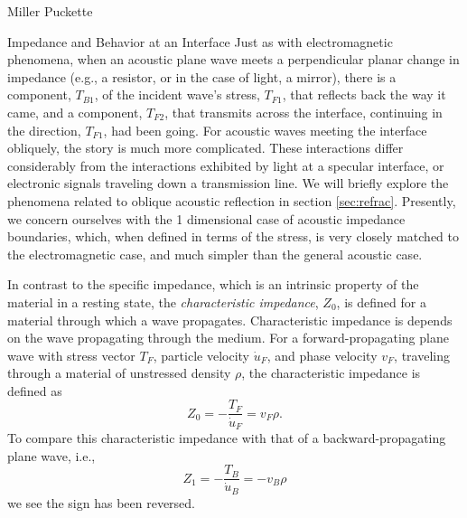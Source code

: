 \documentclass[a4paper,10pt]{report}
\numberwithin{equation}{section}
\begin{document}
\begin{chapter}{Miller Puckette}
\begin{section}{Impedance and Behavior at an Interface}
Just as with electromagnetic phenomena, when an acoustic plane wave meets a perpendicular planar change in impedance (e.g., a resistor, or in the case of light, a mirror), there is a component, $T_{B1}$, of the incident wave's stress, $T_{F1}$, that reflects back the way it came, and a component, $T_{F2}$, that transmits across the interface, continuing in the direction, $T_{F1}$, had been going. For acoustic waves meeting the interface obliquely, the story is much more complicated. These interactions differ considerably from the interactions exhibited by light at a specular interface, or electronic signals traveling down a transmission line. We will briefly explore the phenomena related to oblique acoustic reflection in section \ref{sec:refrac}. Presently, we concern ourselves with the 1 dimensional case of acoustic impedance boundaries, which, when defined in terms of the stress, is very closely matched to the electromagnetic case, and much simpler than the general acoustic case.

In contrast to the specific impedance, which is an intrinsic property of the material in a resting state, the \emph{characteristic impedance}, $Z_0$, is defined for a material through which a wave propagates. Characteristic impedance is depends on the wave propagating through the medium. For a forward-propagating plane wave with stress vector $T_F$, particle velocity $\dot{u}_F$, and phase velocity $v_F$, traveling through a material of unstressed density $\rho$, the characteristic impedance is defined as
\begin{equation}\label{z0F}
 Z_0 = -\frac{T_F}{\dot{u}_F} = v_F \rho \text{.}
\end{equation}
To compare this characteristic impedance with that of a backward-propagating plane wave, i.e.,
\begin{equation}\label{z0B}
Z_1 = -\frac{T_B}{\dot{u}_B} = -v_B \rho
\end{equation}
we see the sign has been reversed.


\end{section}
\end{chapter}
\end{document}
